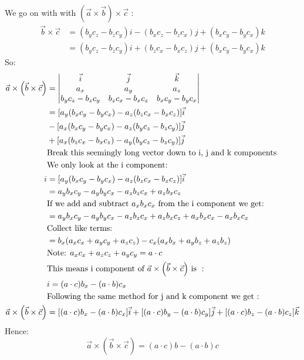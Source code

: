 \documentclass[10pt]{article}
\begin{document}
We go on with  with $(\vec{a} \times \vec{b}) \times \vec{c}$ :
\begin{align*}
\vec{b} \times \vec{c}&=(b_yc_z-b_zc_y)i-(b_xc_z-b_zc_x)j+(b_xc_y-b_yc_x)k \\
&=(b_yc_z-b_zc_y)i+(b_zc_x-b_xc_z)j+(b_xc_y-b_yc_x)k
\end{align*}
So:
\begin{align*} \vec{a} \times \left( \vec{b} \times \vec {c} \right) &=
\begin{vmatrix}
  \vec{i} & \vec{j}& \vec{k}\\
  a_x & a_y & a_z \\
  b_yc_z-b_zc_y & b_zc_x-b_xc_z & b_xc_y-b_yc_x \\
\end{vmatrix} \\
&=[a_y(b_xc_y-b_yc_x)-a_z(b_zc_x-b_xc_z)]\vec{i} \\
&-[a_x(b_xc_y-b_yc_x)-a_z(b_yc_z-b_zc_y)]\vec{j} \\ 
&+ [a_x(b_zc_x-b_xc_z)-a_y(b_yc_z-b_zc_y)]\vec{j} \\ 
&\text{Break this seemingly long vector down to i, j and k components} \\
&\text{We only look at the i component:} \\
i&=[a_y(b_xc_y-b_yc_x)-a_z(b_zc_x-b_xc_z)]\vec{i}\\
&=a_yb_xc_y-a_yb_yc_x-a_zb_zc_x+a_zb_xc_z \\
&\text{If we add and subtract $a_xb_xc_x$ from the i component we get: } \\
&=a_yb_xc_y-a_yb_yc_x-a_zb_zc_x+a_zb_xc_z+a_xb_xc_x-a_xb_xc_x \\
&\text{Collect like terms:} \\
&=b_x(a_xc_x+a_yc_y+a_zc_z)-c_x(a_xb_x+a_yb_z+a_zb_z) \\
&\text{Note: $a_xc_x+a_zc_z+a_yc_y=a \cdot c$} \\
&\text{This means i component of $ \vec{a} \times \left( \vec{b}  \times \vec {c} \right) $ is }: \\
&i=(a \cdot c)b_x-(a \cdot b)c_x \\
&\text{Following the same method for j and k component we get :} \\
  \vec{a} \times \left( \vec{b}  \times \vec {c} \right) &=[(a \cdot c)b_x-(a \cdot b)c_x] \vec{i}+[(a \cdot c)b_y-(a \cdot b)c_y]\vec{j}+[(a \cdot c)b_z-(a \cdot b)c_z]\vec{k}
\end{align*}
Hence:
\begin{displaymath}
  \vec{a} \times \left( \vec{b}  \times \vec {c} \right)  =(a \cdot c)b-(a \cdot b)c
\end{displaymath}
\end{document}

